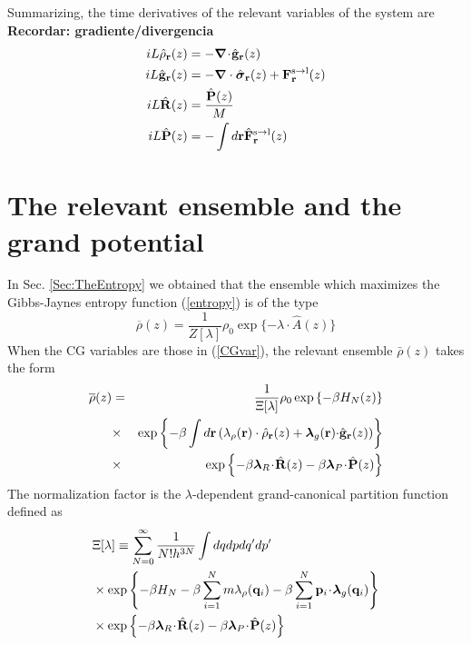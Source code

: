 \documentclass[b5paper,openright,11pt]{book}
\newcommand{\esc}{\!\cdot\!}
\newcommand{\Note}[1]{{\bf \color{red}#1}}    %
\begin{document}
Summarizing, the time derivatives of the relevant variables of the system are
\Note{Recordar: gradiente/divergencia}
\begin{align}
    iL \hat{\rho}_{\bf r}(z) &= -\boldsymbol{\nabla}\esc\hat{\bf g}_{\bf r}(z)
\nonumber\\
iL\hat{\bf g}_{\bf r}(z)
&=-\boldsymbol{\nabla}\cdot \hat{\boldsymbol{\sigma}}_{\bf r}(z)+{\bf F}^{\rm s\to l}_{\bf r}(z) \nonumber \\
    iL\hat{\bf R}(z) &=\frac{\hat{\bf P}(z)}{M}
  \nonumber\\
    iL\hat{\bf P}(z) &=-\int  d{\bf r} \hat{\bf F}^{\rm s\to l}_{\bf r}(z)
   \label{timeDerivatives}  
\end{align}

\section{The relevant ensemble and the grand potential}
In Sec. \ref{Sec:TheEntropy} we obtained that the ensemble which maximizes the Gibbs-Jaynes entropy function (\ref{entropy}) is of the type
\begin{equation}
\overline{\rho}(z) = \frac{1}{Z[\lambda]} \rho_0\exp\{-\lambda\!\cdot\!\hat{A}(z)\}
\end{equation}
When the CG variables are those in (\ref{CGvar}), the relevant ensemble $\bar{\rho}(z)$ takes the form
\begin{eqnarray}
  \overline{\rho}(z)&=&\frac{1}{\Xi[\lambda]}\rho_0\exp\left\{-\beta H_N(z)\right\}
\nonumber\\
&\times&
\exp\left\{-\beta\int d{\bf r}\left(\lambda_\rho({\bf r})\cdot\hat{\rho}_{\bf
    r}(z)+\boldsymbol{\lambda}_g{({\bf r})\cdot}\hat{\bf g}_{\bf r}(z)\right)\right\}
\nonumber\\
&\times&
\exp\left\{-\beta \boldsymbol{\lambda}_{R}\esc\hat{\bf R}(z)
-\beta \boldsymbol{\lambda}_{P}\esc\hat{\bf P}(z)\right\}
\nonumber\\
\label{relensln}
\end{eqnarray}
The   normalization   factor   is  the   $\lambda$-dependent
grand-canonical partition function defined as
\begin{align}
&\Xi[\lambda]
\equiv
 \sum_{N=0}^\infty \frac{1}{N!h^{3N}}
\int dqdp dq'dp'
\nonumber\\
&\times\exp\left\{-\beta H_N-\beta \sum_{i=1}^Nm \lambda_\rho({\bf
    q}_i)-\beta \sum_{i=1}^N{\bf p}_i\esc\boldsymbol{\lambda}_g({\bf q}_i)\right\}
\nonumber\\
&\times\exp\left\{-\beta \boldsymbol{\lambda}_{R}\esc\hat{\bf R}(z)
-\beta \boldsymbol{\lambda}_{P}\esc\hat{\bf P}(z)\right\}
\label{xiln}
\end{align}
\end{document}
